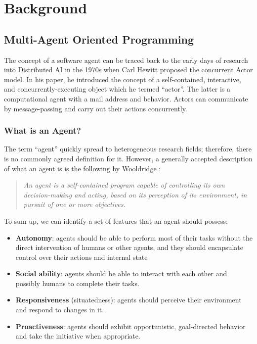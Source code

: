 \chapter{Background}

\section{Multi-Agent Oriented Programming}
The concept of a software agent can be traced back to the early days of research into Distributed AI in the 1970s when Carl Hewitt proposed the concurrent Actor model.
In his paper, he introduced the concept of a self-contained, interactive, and concurrently-executing object which he termed ``actor''.
The latter is a computational agent with a mail address and behavior. Actors can communicate by message-passing and carry out their actions concurrently. \cite{hewitt1977viewing}

\subsection{What is an Agent?}
The term ``agent'' quickly spread to heterogeneous research fields; therefore, there is no commonly agreed definition for it.
However, a generally accepted description of what an agent is is the following by Wooldridge \cite{490039}:
\begin{quote}
    \textit{An agent is a self-contained program capable of controlling its own decision-making and acting, based on its perception of its environment, in pursuit of one or more objectives.}
\end{quote}
To sum up, we can identify a set of features that an agent should possess:
\begin{itemize}
    \item \textbf{Autonomy}: agents should be able to perform most of their tasks without the direct intervention of humans or other agents, and they should encapsulate control over their actions and internal state
    \item \textbf{Social ability}: agents should be able to interact with each other and possibly humans to complete their tasks.
    \item \textbf{Responsiveness} (situatedness): agents should perceive their environment and respond to changes in it.
    \item \textbf{Proactiveness}: agents should exhibit opportunistic, goal-directed behavior and take the initiative when appropriate.
\end{itemize}

